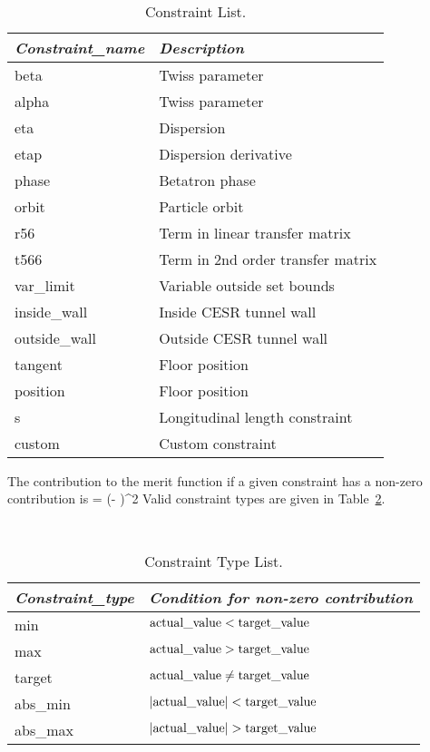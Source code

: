 \begin{table}[h]
\centering
{\tt
\begin{tabular}{|l|l|} \hline
  {\it Constraint\_name}  & {\it Description} \\ \hline 
    beta           & Twiss parameter                        \\ \hline 
    alpha          & Twiss parameter                        \\ \hline 
    eta            & Dispersion                             \\ \hline 
    etap           & Dispersion derivative                  \\ \hline 
    phase          & Betatron phase                         \\ \hline 
    orbit          & Particle orbit                         \\ \hline 
    r56            & Term in linear transfer matrix         \\ \hline 
    t566           & Term in 2nd order transfer matrix      \\ \hline 
    var\_limit     & Variable outside set bounds            \\ \hline 
    inside\_wall   & Inside CESR tunnel wall                \\ \hline 
    outside\_wall  & Outside CESR tunnel wall               \\ \hline 
    tangent        & Floor position                         \\ \hline 
    position       & Floor position                         \\ \hline 
    s              & Longitudinal length constraint         \\ \hline 
    custom         & Custom constraint                      \\ \hline 
\end{tabular}
}
\caption{Constraint List.}
\label{t:cons}
\end{table}

The contribution to the merit function if a given constraint has a non-zero
contribution is
\Begineq
  \merit = \weight \cdot (\actual - \target)^2
\Endeq
Valid constraint types are given in Table~\ref{t:con_type}.
\begin{table}[h]
\centering
{\tt
\begin{tabular}{|l|l|} \hline
  {\it Constraint\_type}  & {\it Condition for non-zero contribution} \\ \hline 
    min           & ${\mbox{actual\_value}} < {\mbox{target\_value}}$      \\ \hline 
    max           & ${\mbox{actual\_value}} > {\mbox{target\_value}}$      \\ \hline 
    target        & ${\mbox{actual\_value}} \ne {\mbox{target\_value}}$    \\ \hline 
    abs\_min      & $|{\mbox{actual\_value}}| < {\mbox{target\_value}}$    \\ \hline 
    abs\_max      & $|{\mbox{actual\_value}}| > {\mbox{target\_value}}$    \\ \hline 
\end{tabular}
}
\caption{Constraint Type List.}
\label{t:con_type}
\end{table}

